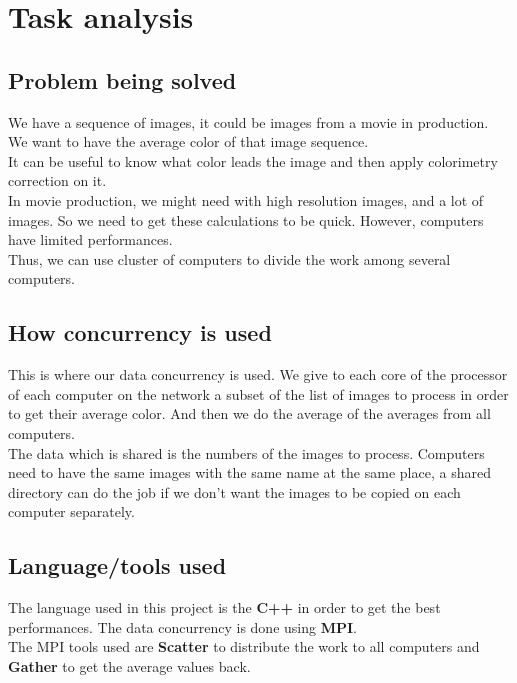 \section{Task analysis}

\subsection{Problem being solved}
We have a sequence of images, it could be images from a movie in production. We want to have the average color of that image sequence.\\
It can be useful to know what color leads the image and then apply colorimetry correction on it.\\
In movie production, we might need with high resolution images, and a lot of images. So we need to get these calculations to be quick. However, computers have limited performances.\\
Thus, we can use cluster of computers to divide the work among several computers.\\
\subsection{How concurrency is used}
This is where our data concurrency is used. We give to each core of the processor of each computer on the network a subset of the list of images to process in order to get their average color. And then we do the average of the averages from all computers.\\
The data which is shared is the numbers of the images to process. Computers need to have the same images with the same name at the same place, a shared directory can do the job if we don't want the images to be copied on each computer separately.
\subsection{Language/tools used}
The language used in this project is the \textbf{C++} in order to get the best performances. The data concurrency is done using \textbf{MPI}.\\
The MPI tools used are \textbf{Scatter} to distribute the work to all computers and \textbf{Gather} to get the average values back.